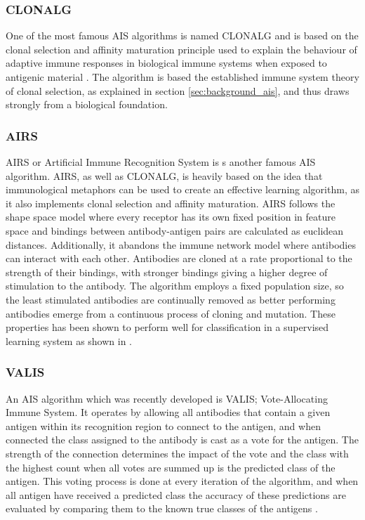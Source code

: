 \subsubsection{CLONALG}
One of the most famous AIS algorithms is named CLONALG and is based on the clonal selection and affinity maturation principle used to explain the behaviour of adaptive immune responses in biological immune systems when exposed to antigenic material \cite{AIS:ClonalSelection}. The algorithm is based the established immune system theory of clonal selection, as explained in section \ref{sec:background_ais}, and thus draws strongly from a biological foundation.

\subsubsection{AIRS}
AIRS or Artificial Immune Recognition System is s another famous AIS algorithm. AIRS, as well as CLONALG, is heavily based on the idea that immunological metaphors can be used to create an effective learning algorithm, as it also implements clonal selection and affinity maturation. AIRS follows the shape space model where every receptor has its own fixed position in feature space and bindings between antibody-antigen pairs are calculated as euclidean distances. Additionally, it abandons the immune network model where antibodies can interact with each other. Antibodies are cloned at a rate proportional to the strength of their bindings, with stronger bindings giving a higher degree of stimulation to the antibody. The algorithm employs a fixed population size, so the least stimulated antibodies are continually removed as better performing antibodies emerge from a continuous process of cloning and mutation. These properties has been shown to perform well for classification in a supervised learning system as shown in \cite{AIS:AIRS,AIS:resource-limited-AIS}.

\subsubsection{VALIS}
An AIS algorithm which was recently developed is VALIS; Vote-Allocating Immune System. It operates by allowing all antibodies that contain a given antigen within its recognition region to connect to the antigen, and when connected the class assigned to the antibody is cast as a vote for the antigen. The strength of the connection determines the impact of the vote and the class with the highest count when all votes are summed up is the predicted class of the antigen. This voting process is done at every iteration of the algorithm, and when all antigen have received a predicted class the accuracy of these predictions are evaluated by comparing them to the known true classes of the antigens \cite{process:valis}.

